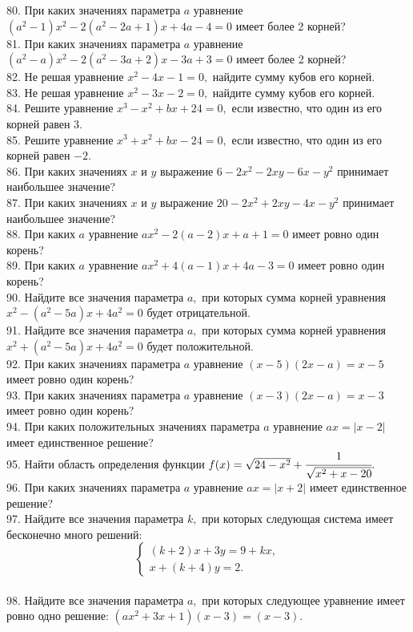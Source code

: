 80. При каких значениях параметра $a$ уравнение $(a^2-1)x^2-2(a^2-2a+1)x+4a-4=0$ имеет более 2 корней?\\
81. При каких значениях параметра $a$ уравнение $(a^2-a)x^2-2(a^2-3a+2)x-3a+3=0$ имеет более 2 корней?\\
82. Не решая уравнение $x^2-4x-1=0,$ найдите сумму кубов его корней.\\
83. Не решая уравнение $x^2-3x-2=0,$ найдите сумму кубов его корней.\\
84. Решите уравнение $x^3-x^2+bx+24=0,$ если известно, что один из его корней равен $3.$\\
85. Решите уравнение $x^3+x^2+bx-24=0,$ если известно, что один из его корней равен $-2.$\\
86. При каких значениях $x$ и $y$ выражение $6-2x^2-2xy-6x-y^2$ принимает наибольшее значение?\\
87. При каких значениях $x$ и $y$ выражение $20-2x^2+2xy-4x-y^2$ принимает наибольшее значение?\\
88. При каких $a$ уравнение $ax^2-2(a-2)x+a+1=0$ имеет ровно один корень?\\
89. При каких $a$ уравнение $ax^2+4(a-1)x+4a-3=0$ имеет ровно один корень?\\
90. Найдите все значения параметра $a,$ при которых сумма корней уравнения $x^2-(a^2-5a)x+4a^2=0$ будет отрицательной.\\
91. Найдите все значения параметра $a,$ при которых сумма корней уравнения $x^2+(a^2-5a)x+4a^2=0$ будет положительной.\\
92. При каких значениях параметра $a$ уравнение $(x-5)(2x-a)=x-5$ имеет ровно один корень?\\
93. При каких значениях параметра $a$ уравнение $(x-3)(2x-a)=x-3$ имеет ровно один корень?\\
94. При каких положительных значениях параметра $a$ уравнение $ax=|x-2|$ имеет единственное решение?\\
95. Найти область определения функции $f(x)=\sqrt{24-x^2}+\cfrac{1}{\sqrt{x^2+x-20}}.$\\
96. При каких значениях параметра $a$ уравнение $ax=|x+2|$ имеет единственное решение?\\
97. Найдите все значения параметра $k,$ при которых следующая система имеет бесконечно много решений:
$$\begin{cases}
(k+2)x+3y=9+kx,\\
x+(k+4)y=2.
\end{cases}$$\\
98. Найдите все значения параметра $a,$ при которых следующее уравнение имеет ровно одно решение: $(ax^2+3x+1)(x-3)=(x-3).$\\
